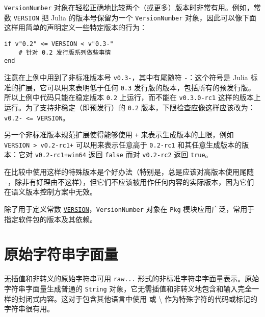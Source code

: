 \texttt{VersionNumber} 对象在轻松正确地比较两个（或更多）版本时非常有用。例如，常数 \texttt{VERSION} 把 Julia 的版本号保留为一个 \texttt{VersionNumber} 对象，因此可以像下面这样用简单的声明定义一些特定版本的行为：




\begin{verbatim}
if v"0.2" <= VERSION < v"0.3-"
    # 针对 0.2 发行版系列做些事情
end
\end{verbatim}



注意在上例中用到了非标准版本号 \texttt{v{\textquotedbl}0.3-{\textquotedbl}}，其中有尾随符 \texttt{-}：这个符号是 Julia 标准的扩展，它可以用来表明低于任何 \texttt{0.3} 发行版的版本，包括所有的预发行版。所以上例中代码只能在稳定版本 \texttt{0.2} 上运行，而不能在 \texttt{v{\textquotedbl}0.3.0-rc1{\textquotedbl}} 这样的版本上运行。为了支持非稳定（即预发行）的 \texttt{0.2} 版本，下限检查应像这样应该改为：\texttt{v{\textquotedbl}0.2-{\textquotedbl} <= VERSION}。



另一个非标准版本规范扩展使得能够使用 \texttt{+} 来表示生成版本的上限，例如 \texttt{VERSION > v{\textquotedbl}0.2-rc1+{\textquotedbl}} 可以用来表示任意高于 \texttt{0.2-rc1} 和其任意生成版本的版本：它对 \texttt{v{\textquotedbl}0.2-rc1+win64{\textquotedbl}} 返回 \texttt{false} 而对 \texttt{v{\textquotedbl}0.2-rc2{\textquotedbl}} 返回 \texttt{true}。



在比较中使用这样的特殊版本是个好办法（特别是，总是应该对高版本使用尾随 \texttt{-}，除非有好理由不这样），但它们不应该被用作任何内容的实际版本，因为它们在语义版本控制方案中无效。



除了用于定义常数 \hyperlink{12605722316331458198}{\texttt{VERSION}}，\texttt{VersionNumber} 对象在 \texttt{Pkg} 模块应用广泛，常用于指定软件包的版本及其依赖。



\hypertarget{5096496368362976040}{}


\section{原始字符串字面量}



无插值和非转义的原始字符串可用 \texttt{raw{\textquotedbl}...{\textquotedbl}} 形式的非标准字符串字面量表示。原始字符串字面量生成普通的 \texttt{String} 对象，它无需插值和非转义地包含和输入完全一样的封闭式内容。这对于包含其他语言中使用 {\textquotedbl} 或 {\textbackslash}{\textquotedbl} 作为特殊字符的代码或标记的字符串很有用。



